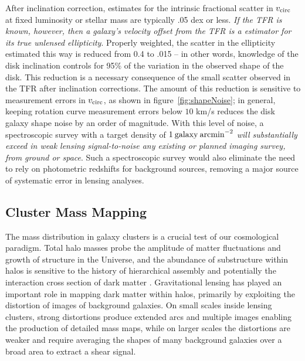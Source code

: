 \documentclass[12pt]{article}
\begin{document}
After inclination correction, estimates for the intrinsic fractional scatter in $v_{\rm circ}$ at fixed luminosity or stellar mass are typically .05 dex or less. {\it If the TFR is known, however, then a galaxy's velocity offset from the TFR is a estimator for its true unlensed ellipticity}. Properly weighted, the scatter in the ellipticity estimated this way is reduced from 0.4 to .015 -- in other words, knowledge of the disk inclination controls for 95\% of the variation in the observed shape of the disk. This reduction is a necessary consequence of the small scatter observed in the TFR after inclination corrections. The amount of this reduction is sensitive to measurement errors in $v_{\rm circ}$, as shown in figure~\ref{fig:shapeNoise}; in general, keeping rotation curve measurement errors below $10 $ km/s reduces the disk galaxy shape noise by an order of magnitude. With this level of noise, a spectroscopic survey with a target density of $1\: {\rm galaxy \: arcmin}^{-2}$ {\it will substantially exceed in weak lensing signal-to-noise any existing or planned imaging survey, from ground or space}. Such a spectroscopic survey would also eliminate the need to rely on photometric redshifts for background sources, removing a major source of systematic error in lensing analyses. 


\subsection{Cluster Mass Mapping}

The mass distribution in galaxy clusters is a crucial test of our cosmological paradigm. Total halo masses probe the amplitude of matter fluctuations and growth of structure in the Universe, and the abundance of substructure within halos is sensitive to the history of hierarchical assembly and potentially the interaction cross section of dark matter \citep[e.g.,][]{Natarajan2002a, Natarajan2002b, Voit2005, Clowe2006}. Gravitational lensing has played an important role in mapping dark matter within halos, primarily by exploiting the distortion of images of background galaxies. On small scales inside lensing clusters, strong distortions produce extended arcs and multiple images enabling the production of detailed mass maps, while on larger scales the distortions are weaker and require averaging the shapes of many background galaxies over a broad area to extract a shear signal.
\end{document}
